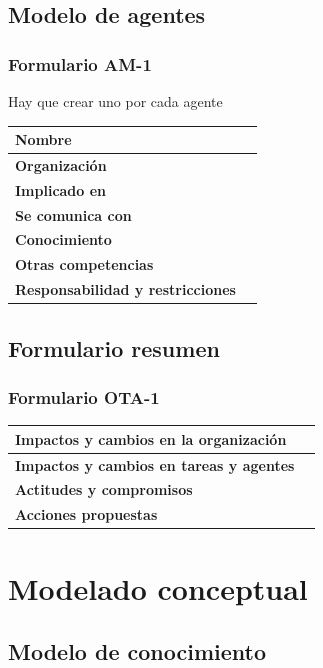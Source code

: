 \documentclass[a4paper,11pt]{article}
\begin{document}
		\subsection{Modelo de agentes}
			\subsubsection{Formulario AM-1}
			Hay que crear uno por cada agente
			\begin{center}
				\begin{tabular}{| l | l |}
					\hline
					\textbf{Nombre} & \\
					\hline
					\textbf{Organización} & \\
					\hline
					\textbf{Implicado en} & \\
					\hline
					\textbf{Se comunica con} & \\
					\hline
					\textbf{Conocimiento} & \\
					\hline
					\textbf{Otras competencias} & \\
					\hline
					\textbf{Responsabilidad y restricciones} & \\
					\hline
				\end{tabular}
			\end{center}
		\subsection{Formulario resumen}
			\subsubsection{Formulario OTA-1}
			\begin{center}
				\begin{tabular}{| l | l |}
					\hline
					\textbf{Impactos y cambios en la organización} & \\
					\hline
					\textbf{Impactos y cambios en tareas y agentes} & \\
					\hline
					\textbf{Actitudes y compromisos} & \\
					\hline
					\textbf{Acciones propuestas} & \\
					\hline
				\end{tabular}
			\end{center}
	\newpage
	\section{Modelado conceptual}
		\subsection{Modelo de conocimiento}
\end{document}
